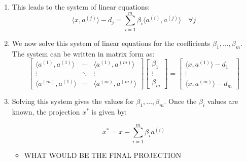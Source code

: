 \begin{derivation}
\begin{enumerate}
                \item This leads to the system of linear equations:
                \[
                \langle x, a^{(j)} \rangle - d_j = \sum_{i=1}^{m} \beta_i \langle a^{(i)}, a^{(j)} \rangle \quad \forall j
                \]
                
                \item We now solve this system of linear equations for the coefficients $\beta_1, \dots, \beta_m$. The system can be written in matrix form as:
                \[
                \begin{bmatrix}
                \langle a^{(1)}, a^{(1)} \rangle & \cdots & \langle a^{(1)}, a^{(m)} \rangle \\
                \vdots & \ddots & \vdots \\
                \langle a^{(m)}, a^{(1)} \rangle & \cdots & \langle a^{(m)}, a^{(m)} \rangle
                \end{bmatrix}
                \begin{bmatrix}
                \beta_1 \\
                \vdots \\
                \beta_m
                \end{bmatrix}
                =
                \begin{bmatrix}
                \langle x, a^{(1)} \rangle - d_1 \\
                \vdots \\
                \langle x, a^{(m)} \rangle - d_m
                \end{bmatrix}
                \]
                
                \item Solving this system gives the values for $\beta_1, \dots, \beta_m$. Once the $\beta_i$ values are known, the projection $x^*$ is given by:
                
                \[
                x^* = x - \sum_{i=1}^{m} \beta_i a^{(i)} 
                \]
                \begin{itemize}
                    \item WHAT WOULD BE THE FINAL PROJECTION
                \end{itemize}
            \end{enumerate}            
        \end{derivation}

